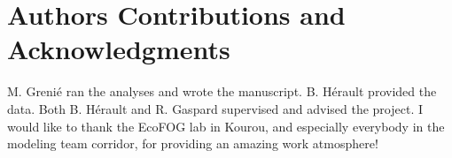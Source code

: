 \label{sec:Ack}
\section*{Authors Contributions and Acknowledgments}

M. Grenié ran the analyses and wrote the manuscript. B. Hérault provided the data. Both B. Hérault and R. Gaspard supervised and advised the project.
I would like to thank the EcoFOG lab in Kourou, and especially everybody in the modeling team corridor, for providing an amazing work atmosphere!